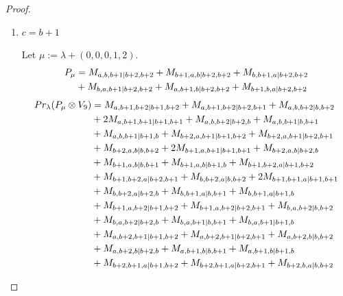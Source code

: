 \begin{proof}
\begin{enumerate}
\begin{enumerate}
  \item $c=b+1$ \par
        Let $\mu:=\lambda + (0,0,0,1,2) $.
        \begin{equation}\notag
          \begin{aligned}
            P_\mu &= M_{a,b,b+1|b+2,b+2}
+ M_{b+1,a,b|b+2,b+2}
+ M_{b,b+1,a|b+2,b+2}\\
                                              &
+ M_{b,a,b+1|b+2,b+2}
+ M_{a,b+1,b|b+2,b+2}
+ M_{b+1,b,a|b+2,b+2}
          \end{aligned}
        \end{equation}
        \begin{equation}\notag
          \begin{aligned}
            Pr_{\lambda}(P_\mu \otimes V_{9}) &=
M_{a,b+1,b+2|b+1,b+2}
+ M_{a,b+1,b+2|b+2,b+1}
+ M_{a,b,b+2|b,b+2}\\
                                              &
+ 2M_{a,b+1,b+1|b+1,b+1}
+ M_{a,b,b+2|b+2,b}
+ M_{a,b,b+1|b,b+1}\\
                                              &
+ M_{a,b,b+1|b+1,b}
+ M_{b+2,a,b+1|b+1,b+2}
+ M_{b+2,a,b+1|b+2,b+1}\\
                                              &
+ M_{b+2,a,b|b,b+2}
+ 2M_{b+1,a,b+1|b+1,b+1}
+ M_{b+2,a,b|b+2,b}\\
                                              &
+ M_{b+1,a,b|b,b+1}
+ M_{b+1,a,b|b+1,b}
+ M_{b+1,b+2,a|b+1,b+2}\\
                                              &
+ M_{b+1,b+2,a|b+2,b+1}
+ M_{b,b+2,a|b,b+2}
+ 2M_{b+1,b+1,a|b+1,b+1}\\
                                              &
+ M_{b,b+2,a|b+2,b}
+ M_{b,b+1,a|b,b+1}
+ M_{b,b+1,a|b+1,b}\\
                                              &
+ M_{b+1,a,b+2|b+1,b+2}
+ M_{b+1,a,b+2|b+2,b+1}
+ M_{b,a,b+2|b,b+2}\\
                                              &
+ M_{b,a,b+2|b+2,b}
+ M_{b,a,b+1|b,b+1}
+ M_{b,a,b+1|b+1,b}\\
                                              &
+ M_{a,b+2,b+1|b+1,b+2}
+ M_{a,b+2,b+1|b+2,b+1}
+ M_{a,b+2,b|b,b+2}\\
                                              &
+ M_{a,b+2,b|b+2,b}
+ M_{a,b+1,b|b,b+1}
+ M_{a,b+1,b|b+1,b}\\
                                              &
+ M_{b+2,b+1,a|b+1,b+2}
+ M_{b+2,b+1,a|b+2,b+1}
+ M_{b+2,b,a|b,b+2}\\

\end{aligned}
\end{equation}
\end{enumerate}
\end{enumerate}
\end{proof}
